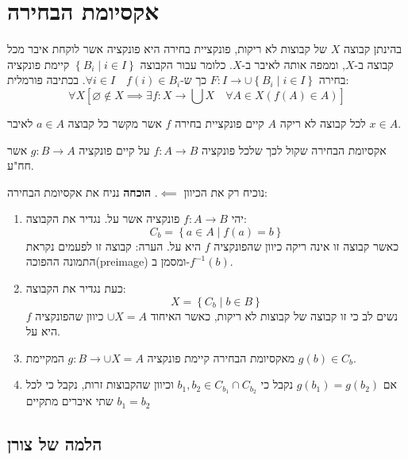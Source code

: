 \documentclass{tstextbook}
\begin{document}
\section{אקסיומת הבחירה}

\begin{definition}
בהינתן קבוצה \(X\) של קבוצות לא ריקות, פונקציית בחירה היא פונקציה אשר לוקחת איבר מכל קבוצה ב-\(X\), וממפה אותה לאיבר ב-\(X\). כלומר עבור הקבוצה \(\left\{  B_{i}\mid i \in I  \right\}\) קיימת פונקציה בחירה \(F:I\to \cup \left\{  B_{i}\mid i \in I  \right\}\) כך ש-\(\forall i \in I\quad f(i) \in B_{i}\). בכתיבה פורמלית:
$$\forall X\left[ \varnothing \not \in X\implies \exists f:X\to \bigcup X \quad \forall A \in X\left( f(A)\in A \right)  \right]$$

\end{definition}
\begin{definition}
לכל קבוצה לא ריקה \(A\) קיים פונקציית בחירה \(f\) אשר מקשר כל קבוצה \(a \in A\) לאיבר \(x \in A\). 

\end{definition}
\begin{proposition}
אקסיומת הבחירה שקול לכך שלכל פונקציה \(f:A\to B\) על קיים פונקציה \(g:B\to A\) אשר חח"ע.

\end{proposition}
נוכיח רק את הכיוון \(\impliedby\).
\textbf{הוכחה}
נניח את אקסיומת הבחירה:

\begin{enumerate}
  \item יהי \(f:A\to B\) פונקציה אשר על. נגדיר את הקבוצה: 
$$C_{b}=\left\{  a \in A\mid f(a)=b  \right\}$$
כאשר קבוצה זו אינה ריקה כיוון שהפונקציה \(f\) היא על. 
הערה: קבוצה זו לפעמים נקראת התמונה ההפוכה(preimage) ומסמן ב-\(f^{-1}(b)\).


  \item כעת נגדיר את הקבוצה: 
$$X=\left\{  C_{b}\mid b \in B  \right\}$$
נשים לב כי זו קבוצה של קבוצות לא ריקות, כאשר האיחוד \(\cup X=A\) כיוון שהפונקציה \(f\) היא על.


  \item מאקסיומת הבחירה קיימת פונקציה \(g:B\to \cup X=A\) המקיימת \(g(b)\in C_{b}\). 


  \item אם \(g(b_{1})=g(b_{2})\) נקבל כי \(b_{1},b_{2}\in C_{b_{1}}\cap C_{b_{2}}\) וכיוון שהקבוצות זרות, נקבל כי לכל שתי איברים מתקיים \(b_{1}=b_{2}\)


\end{enumerate}
\subsection{הלמה של צורן}
\end{document}
